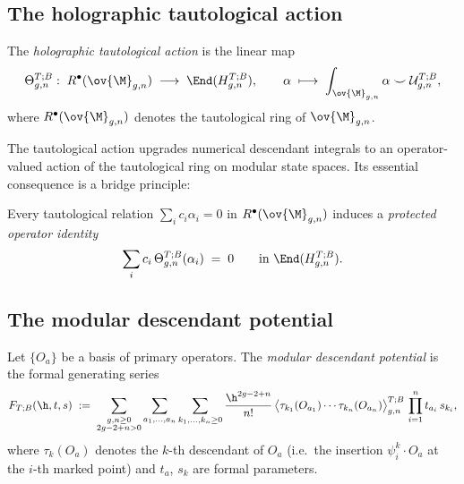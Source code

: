 \subsection{The holographic tautological action}
\label{subsec:holographic-tautological-action}

\begin{definition}
\label{def:holographic-tautological-action}
The \emph{holographic tautological action} is the linear map
\begin{equation}
\label{eq:tautological-action}
\Theta_{g,n}^{T;B}:\;
R^\bullet(\ov{\M}_{g,n})
\;\longrightarrow\;
\End(H_{g,n}^{T;B}),
\qquad
\alpha \;\longmapsto\;
\int_{\ov{\M}_{g,n}} \alpha \smile \mathcal{U}_{g,n}^{T;B},
\end{equation}
where $R^\bullet(\ov{\M}_{g,n})$ denotes the tautological ring of $\ov{\M}_{g,n}$.
\end{definition}

The tautological action upgrades numerical descendant integrals to an operator-valued
action of the tautological ring on modular state spaces.  Its essential consequence is
a bridge principle:

\begin{proposition}
\label{prop:tautological-holographic-bridge}
Every tautological relation $\sum_i c_i \alpha_i = 0$ in $R^\bullet(\ov{\M}_{g,n})$
induces a \emph{protected operator identity}
\[
\sum_i c_i\,\Theta_{g,n}^{T;B}(\alpha_i) \;=\; 0
\qquad \text{in } \End(H_{g,n}^{T;B}).
\]
\end{proposition}

\subsection{The modular descendant potential}
\label{subsec:modular-descendant-potential}

\begin{definition}
\label{def:modular-descendant-potential}
Let $\{O_a\}$ be a basis of primary operators.  The \emph{modular descendant potential}
is the formal generating series
\begin{equation}
\label{eq:modular-descendant-potential}
F_{T;B}(\h,t,s)
\;:=\;
\sum_{\substack{g,n \geq 0 \\ 2g-2+n > 0}}
\sum_{a_1,\dots,a_n}
\sum_{k_1,\dots,k_n \geq 0}
\frac{\h^{2g-2+n}}{n!}\,
\bigl\langle \tau_{k_1}(O_{a_1}) \cdots \tau_{k_n}(O_{a_n})
\bigr\rangle_{g,n}^{T;B}\,
\prod_{i=1}^n t_{a_i}\,s_{k_i},
\end{equation}
where $\tau_k(O_a)$ denotes the $k$-th descendant of $O_a$ (i.e.\ the insertion
$\psi_i^k \cdot O_a$ at the $i$-th marked point) and $t_a$, $s_k$ are formal parameters.
\end{definition}


